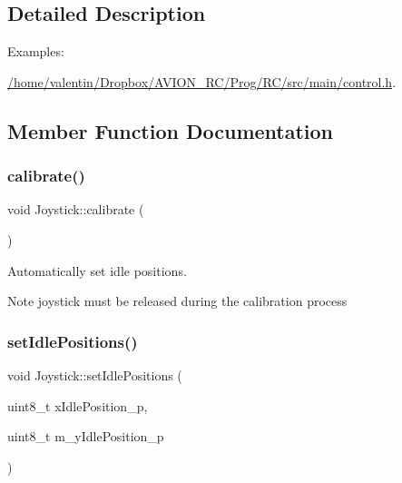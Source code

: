 \subsection{Detailed Description}
\begin{Desc}
\item[Examples\+: ]\par
\hyperlink{_2home_2valentin_2_dropbox_2_a_v_i_o_n__r_c_2_prog_2_r_c_2src_2main_2control_8h-example}{/home/valentin/\+Dropbox/\+A\+V\+I\+O\+N\+\_\+\+R\+C/\+Prog/\+R\+C/src/main/control.\+h}.\end{Desc}


\subsection{Member Function Documentation}
\mbox{\label{class_joystick_ae2a8edfcf0aa98fba3e4bfb31ebc8200}} 
\subsubsection{\texorpdfstring{calibrate()}{calibrate()}}
{\footnotesize\ttfamily void Joystick\+::calibrate (\begin{DoxyParamCaption}{ }\end{DoxyParamCaption})}



Automatically set idle positions. 

\begin{DoxyNote}{Note}
joystick must be released during the calibration process 
\end{DoxyNote}
\mbox{\label{class_joystick_a70f101e3395a939fb757522b14d830c9}} 
\subsubsection{\texorpdfstring{set\+Idle\+Positions()}{setIdlePositions()}}
{\footnotesize\ttfamily void Joystick\+::set\+Idle\+Positions (\begin{DoxyParamCaption}\item[{uint8\+\_\+t}]{x\+Idle\+Position\+\_\+p,  }\item[{uint8\+\_\+t}]{m\+\_\+y\+Idle\+Position\+\_\+p }\end{DoxyParamCaption})}



